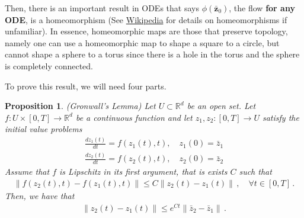 \documentclass[12pt,letterpaper, onecolumn]{exam}
\newtheorem{proposition}[theorem]{Proposition}
\theoremstyle{definition}
\begin{document}
Then, there is an important result in ODEs that says $\phi(\bar{\bm{z}}_0)$, the flow \textbf{for any ODE}, is a homeomorphism (See \href{https://en.wikipedia.org/wiki/Homeomorphism}{Wikipedia} for details on homeomorphisms if unfamiliar). In essence, homeomorphic maps are those that preserve topology, namely one can use a homeomorphic map to shape a square to a circle, but cannot shape a sphere to a torus since there is a hole in the torus and the sphere is completely connected. 

To prove this result, we will need four parts.

\begin{proposition}(Gronwall's Lemma) 
Let $U \subset \mathbb{R}^d$ be an open set. Let $f : U \times [0, T] \to \mathbb{R}^d$ be a continuous function and let $z_1, z_2: [0, T] \to U$ satisfy the initial value problems
\begin{align}
    \frac{d z_1(t)}{dt} = f(z_1(t), t), \quad z_1(0) = \bar{z}_1 \\ 
    \frac{d z_2(t)}{dt} = f(z_2(t), t), \quad z_2(0) = \bar{z}_2
\end{align}
Assume that $f$ is Lipschitz in its first argument, that is exists $C$ such that 
\begin{align}
    \|f(z_2(t), t) - f(z_1(t), t)\| \leq C \|z_2(t) - z_1(t)\|\,, \quad \forall t \in [0, T]\,.
\end{align}
Then, we have that 
\begin{align}
    \|z_2(t) - z_1(t) \| \leq e^{Ct}\|\bar{z}_2 - \bar{z}_1\|\,. 
\end{align}
\end{proposition}
\end{document}
